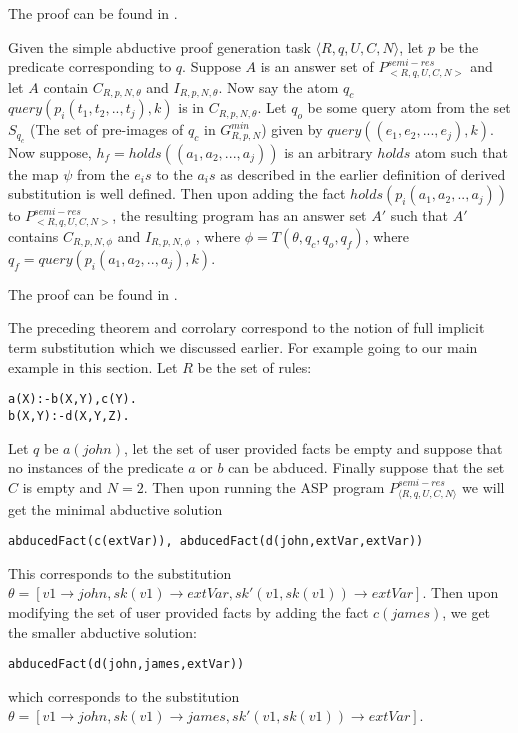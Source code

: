 The proof can be found in \cite{extended_version}.


%


\begin{corollary}\label{thm:addfact}
Given the simple abductive proof generation task $\langle R,q,U,C,N\rangle$, let $p$ be the predicate corresponding to $q$. Suppose $A$ is an answer set of $P^{semi-res}_{<R,q,U,C,N>}$ and let $A$ contain $C_{R,p,N,\theta}$ and $I_{R,p,N,\theta}$. Now say the atom $q_{c}$ $query(p_{i}(t_{1},t_{2},..,t_{j}),k)$ is in $C_{R,p,N,\theta}$. Let $q_{o}$ be some query atom from the set $S_{q_{c}}$ (The set of pre-images of $q_{c}$ in $G_{R,p,N}^{min}$) given by $query((e_{1},e_{2},...,e_{j}),k)$. Now suppose, $h_{f}= holds((a_{1},a_{2},...,a_{j}))$ is an arbitrary $holds$ atom such that the map $\psi$ from the $e_{i}s$ to the $a_{i}s$ as described in the earlier definition of derived substitution is well defined. Then upon adding the fact $holds(p_{i}(a_{1},a_{2},..,a_{j}))$ to $P^{semi-res}_{<R,q,U,C,N>}$, the resulting program has an answer set $A'$ such that $A'$ contains $C_{R,p,N,\phi}$ and $I_{R,p,N,\phi}$ , where $\phi = T(\theta, q_{c}, q_{o}, q_{f})$, where $q_{f} = query(p_{i}(a_{1},a_{2},..,a_{j}),k)$. 
\end{corollary}

The proof can be found in \cite{extended_version}.



The preceding theorem and corrolary correspond to the notion of full implicit term substitution which we discussed earlier. For example going to our main example in this section. Let $R$ be the set of rules:\begin{lstlisting}[frame=none]
a(X):-b(X,Y),c(Y).
b(X,Y):-d(X,Y,Z).
\end{lstlisting}

Let $q$ be $a(john)$, let the set of user provided facts be empty and suppose that no instances of the predicate $a$ or $b$ can be abduced. Finally suppose that the set $C$ is empty and $N=2$. Then upon running the ASP program $P_{\langle R,q,U,C,N\rangle}^{semi-res}$ we will get the minimal abductive solution \begin{lstlisting}[frame=none]
abducedFact(c(extVar)), abducedFact(d(john,extVar,extVar))
\end{lstlisting} 
This corresponds to the substitution $\theta =[v1\rightarrow john,sk(v1) \rightarrow extVar, sk'(v1,sk(v1))\rightarrow extVar]$. Then upon modifying the set of user provided facts by adding the fact $c(james)$, we get the smaller abductive solution:
\begin{lstlisting}[frame=none]
abducedFact(d(john,james,extVar))
\end{lstlisting} which corresponds to the substitution $\theta =[v1\rightarrow john,sk(v1) \rightarrow james, sk'(v1,sk(v1))\rightarrow extVar]$. 

